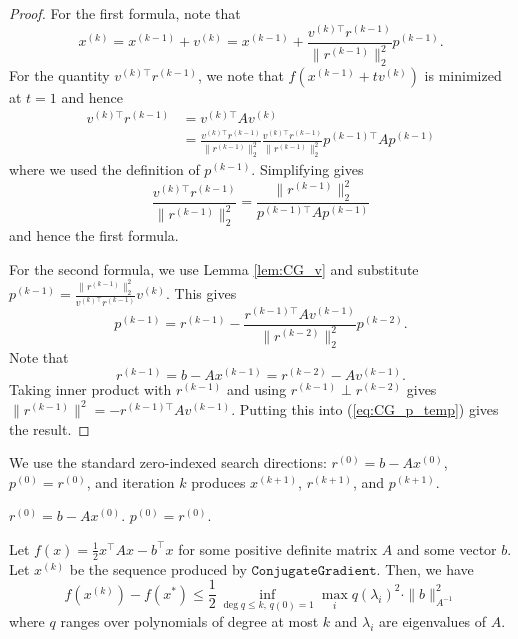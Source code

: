 \begin{proof}
For the first formula, note that
\[
x^{(k)}=x^{(k-1)}+v^{(k)}=x^{(k-1)}+\frac{v^{(k)\top}r^{(k-1)}}{\|r^{(k-1)}\|^{2}_{2}}p^{(k-1)}.
\]
For the quantity $v^{(k)\top}r^{(k-1)}$, we note that $f(x^{(k-1)}+tv^{(k)})$
is minimized at $t=1$ and hence
\begin{align*}
v^{(k)\top}r^{(k-1)} & =v^{(k)\top}Av^{(k)}\\
 & =\frac{v^{(k)\top}r^{(k-1)}}{\|r^{(k-1)}\|^{2}_{2}}\frac{v^{(k)\top}r^{(k-1)}}{\|r^{(k-1)}\|^{2}_{2}}p^{(k-1)\top}Ap^{(k-1)}
\end{align*}
where we used the definition of $p^{(k-1)}$. Simplifying gives
\[
\frac{v^{(k)\top}r^{(k-1)}}{\|r^{(k-1)}\|^{2}_{2}}=\frac{\|r^{(k-1)}\|^{2}_{2}}{p^{(k-1)\top}Ap^{(k-1)}}
\]
and hence the first formula.

For the second formula, we use Lemma \ref{lem:CG_v} and substitute
$p^{(k-1)}=\frac{\|r^{(k-1)}\|^{2}_{2}}{v^{(k)\top}r^{(k-1)}}v^{(k)}$.
This gives
\begin{equation}
p^{(k-1)}=r^{(k-1)}-\frac{r^{(k-1)\top}Av^{(k-1)}}{\|r^{(k-2)}\|^{2}_{2}}p^{(k-2)}.\label{eq:CG_p_temp}
\end{equation}
Note that
\[
r^{(k-1)}=b-Ax^{(k-1)}=r^{(k-2)}-Av^{(k-1)}.
\]
Taking inner product with $r^{(k-1)}$ and using $r^{(k-1)}\perp r^{(k-2)}$
gives $\|r^{(k-1)}\|^{2}=-r^{(k-1)\top}Av^{(k-1)}$. Putting this
into (\ref{eq:CG_p_temp}) gives the result.
\end{proof}
We use the standard zero-indexed search directions: $r^{(0)}=b-Ax^{(0)}$,
$p^{(0)}=r^{(0)}$, and iteration $k$ produces $x^{(k+1)}$, $r^{(k+1)}$,
and $p^{(k+1)}$.

\begin{algorithm2e}[H]

\caption{$\mathtt{ConjugateGradient}$ (CG)}

\SetAlgoLined

$r^{(0)}=b-Ax^{(0)}$. $p^{(0)}=r^{(0)}$.


\end{algorithm2e}
\begin{thm}
\label{thm:CG}Let $f(x)=\frac{1}{2}x^{\top}Ax-b^{\top}x$ for some
positive definite matrix $A$ and some vector $b$. Let $x^{(k)}$
be the sequence produced by $\mathtt{ConjugateGradient}$. Then, we
have
\[
f(x^{(k)})-f(x^{*})\leq\frac{1}{2}\inf_{\deg q\leq k,\,q(0)=1}\max_{i}q(\lambda_{i})^{2}\cdot\|b\|^{2}_{A^{-1}}
\]
where $q$ ranges over polynomials of degree at most $k$ and $\lambda_{i}$
are eigenvalues of $A$.
\end{thm}

